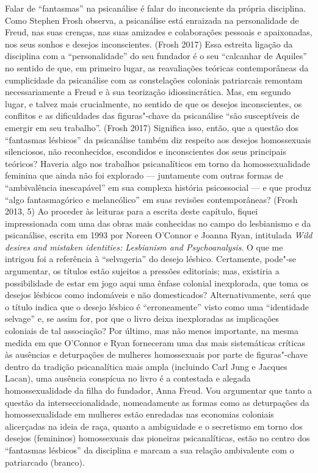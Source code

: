 Falar de ``fantasmas'' na psicanálise é falar do inconsciente da própria
disciplina. Como Stephen Frosh observa, a psicanálise está enraizada na
personalidade de Freud, nas suas crenças, nas suas amizades e
colaborações pessoais e apaixonadas, nos seus sonhos e desejos
inconscientes. (Frosh 2017) Essa estreita ligação da disciplina com a
``personalidade'' do seu fundador é o seu ``calcanhar de Aquiles'' no
sentido de que, em primeiro lugar, as reavaliações teóricas
contemporâneas da cumplicidade da psicanálise com as constelações
coloniais patriarcais remontam necessariamente a Freud e à sua
teorização idiossincrática. Mas, em segundo lugar, e talvez mais
crucialmente, no sentido de que os desejos inconscientes, os conflitos e
as dificuldades das figuras"-chave da psicanálise ``são susceptíveis de
emergir em seu trabalho''. (Frosh 2017) Significa isso, então, que a
questão dos ``fantasmas lésbicos'' da psicanálise também diz respeito aos
desejos homossexuais silenciosos, não reconhecidos, escondidos e
inconscientes dos seus principais teóricos? Haveria algo nos trabalhos
psicanalíticos em torno da homossexualidade feminina que ainda não foi
explorado --- juntamente com outras formas de ``ambivalência inescapável''
em sua complexa história psicossocial --- e que produz ``algo
fantasmagórico e melancólico'' em suas revisões contemporâneas? (Frosh
2013, 5) Ao proceder às leituras para a escrita deste capítulo, fiquei
impressionada com uma das obras mais conhecidas no campo do lesbianismo
e da psicanálise, escrita em 1993 por Noreen O'Connor e Joanna Ryan,
intitulada \emph{Wild desires and mistaken identities: Lesbianism and
Psychoanalysis}. O que me intrigou foi a referência à ``selvageria'' do
desejo lésbico. Certamente, pode"-se argumentar, os títulos estão
sujeitos a pressões editoriais; mas, existiria a possibilidade de estar
em jogo aqui uma ênfase colonial inexplorada, que toma os desejos
lésbicos como indomáveis e não domesticados? Alternativamente, será que
o título indica que o desejo lésbico é ``erroneamente'' visto como uma
``identidade selvage'' e, se assim for, por que o livro deixa
inexploradas as implicações coloniais de tal associação? Por último, mas
não menos importante, na mesma medida em que O'Connor e Ryan forneceram
uma das mais sistemáticas críticas às ausências e deturpações de
mulheres homossexuais por parte de figuras"-chave dentro da tradição
psicanalítica mais ampla (incluindo Carl Jung e Jacques Lacan), uma
ausência conspícua no livro é a contestada e alegada homossexualidade da
filha do fundador, Anna Freud. Vou argumentar que tanto a questão da
interseccionalidade, nomeadamente as formas como as deturpações da
homossexualidade em mulheres estão enredadas nas economias coloniais
alicerçadas na ideia de raça, quanto a ambiguidade e o secretismo em
torno dos desejos (femininos) homossexuais das pioneiras psicanalíticas,
estão no centro dos ``fantasmas lésbicos'' da disciplina e marcam a sua
relação ambivalente com o patriarcado (branco).

